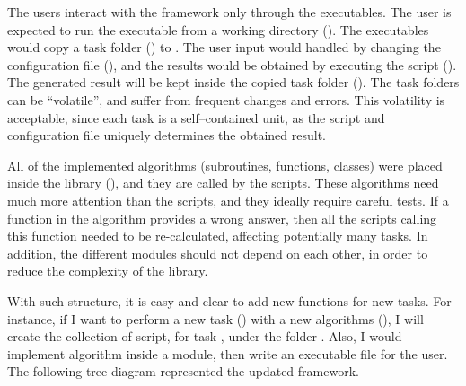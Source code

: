 \documentclass[11pt,twoside]{report}
\begin{document}
The users interact with the framework only through the executables. The user is expected to run the executable from a working directory (). The executables would copy a task folder () to . The user input would handled by changing the configuration file (), and the results would be obtained by executing the script (). The generated result will be kept inside the copied task folder (). The task folders can be ``volatile'', and suffer from frequent changes and errors. This volatility is acceptable, since each task is a self--contained unit, as the script and configuration file uniquely determines the obtained result.

All of the implemented algorithms (subroutines, functions, classes) were placed inside the library (), and they are called by the scripts. These algorithms need much more attention than the scripts, and they ideally require careful tests. If a function in the algorithm provides a wrong answer, then all the scripts calling this function needed to be re-calculated, affecting potentially many tasks. In addition, the different modules should not depend on each other, in order to reduce the complexity of the library.

With such structure, it is easy and clear to add new functions for new tasks. For instance, if I want to perform a new task () with a new algorithms (), I will create the collection of script, for task , under the folder . Also, I would implement algorithm  inside a module, then write an executable file for the user. The following tree diagram represented the updated framework.

\begin{tcolorbox}[
title=Project Structure of My Framework,
enlarge bottom by=0.5em,
enlarge top by=0.5em,
]

\begin{diagram}
\end{diagram}

\end{tcolorbox}
\end{document}
